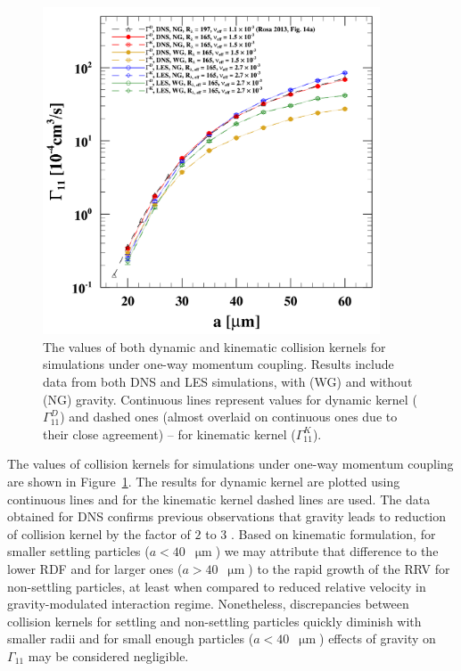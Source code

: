 \documentclass{pracamgren}
\begin{document}
\begin{figure}[ht]
\centering
\includegraphics[width=10cm]{figures/2-07_owcgamma.pdf}
\caption{
The values of both dynamic and kinematic collision kernels for simulations under one-way momentum coupling.
Results include data from both DNS and LES simulations, with (WG) and without (NG) gravity.
Continuous lines represent values for dynamic kernel ($\Gamma_{11}^D$) and dashed ones (almost overlaid on continuous ones due to their close agreement) -- for kinematic kernel ($\Gamma_{11}^K$). 
}
\label{fig:owcgamma}
\end{figure}

The values of collision kernels for simulations under one-way momentum coupling are shown in Figure~\ref{fig:owcgamma}.
The results for dynamic kernel are plotted using continuous lines and for the kinematic kernel dashed lines are used.
The data obtained for DNS confirms previous observations that gravity leads to reduction of collision kernel by the factor of $2$ to $3$ \parencite{Rosa2013}.
Based on kinematic formulation, for smaller settling particles (${a < 40}$~$\upmu\text{m}$) we may attribute that difference to the lower RDF and for larger ones (${a > 40}$~$\upmu\text{m}$) to the rapid growth of the RRV for non-settling particles, at least when compared to reduced relative velocity in gravity-modulated interaction regime.
Nonetheless, discrepancies between collision kernels for settling and non-settling particles quickly diminish with smaller radii and for small enough particles (${a < 40}$~$\upmu\text{m}$) effects of gravity on $\Gamma_{11}$ may be considered negligible.
\end{document}
